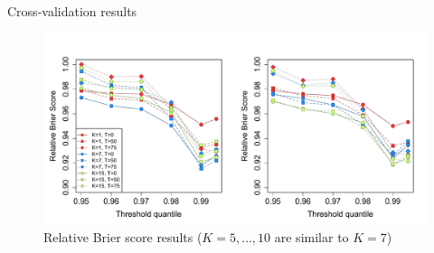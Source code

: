 \documentclass{beamer}
\begin{document}
\begin{frame}{Cross-validation results}
  \centering
  \begin{figure}
    \includegraphics[width=\linewidth, trim=0 0 0 1in]{./plots/pot/bs-ozone.pdf}
    \caption{Relative Brier score results ($K = 5, \ldots, 10$ are similar to $K = 7$)}
  \end{figure}
\end{frame}


\end{document}
